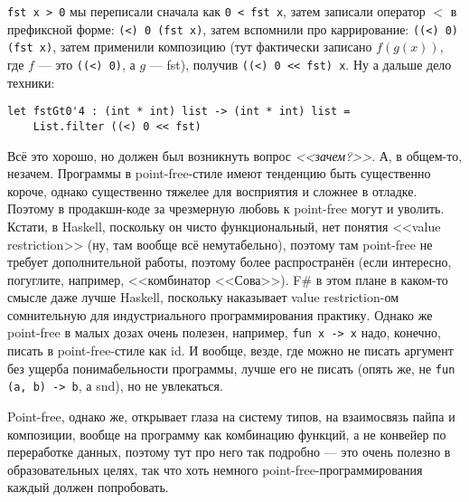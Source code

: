 \documentclass[a5paper]{article}
\begin{document}
\texttt{fst x > 0} мы переписали сначала как \texttt{0 < fst x}, затем записали оператор $<$ в префиксной форме: \texttt{(<) 0 (fst x)}, затем вспомнили про каррирование: \texttt{((<) 0) (fst x)}, затем применили композицию (тут фактически записано $f(g(x))$, где  $f$ --- это \texttt{((<) 0)}, а $g$ --- fst), получив \texttt{((<) 0 << fst) x}. Ну а дальше дело техники:

\begin{verbatim}
let fstGt0'4 : (int * int) list -> (int * int) list = 
    List.filter ((<) 0 << fst)
\end{verbatim}

Всё это хорошо, но должен был возникнуть вопрос \emph{<<зачем?>>}. А, в общем-то, незачем. Программы в point-free-стиле имеют тенденцию быть существенно короче, однако существенно тяжелее для восприятия и сложнее в отладке. Поэтому в продакшн-коде за чрезмерную любовь к point-free могут и уволить. Кстати, в Haskell, поскольку он чисто функциональный, нет понятия <<value restriction>> (ну, там вообще всё немутабельно), поэтому там point-free не требует дополнительной работы, поэтому более распространён (если интересно, погуглите, например, <<комбинатор <<Сова>>). F\# в этом плане в каком-то смысле даже лучше Haskell, поскольку наказывает value restriction-ом сомнительную для индустриального программирования практику. Однако же point-free в малых дозах очень полезен, например, \texttt{fun x -> x} надо, конечно, писать в point-free-стиле как id. И вообще, везде, где можно не писать аргумент без ущерба понимабельности программы, лучше его не писать (опять же, не \texttt{fun (a, b) -> b}, а snd), но не увлекаться.

Point-free, однако же, открывает глаза на систему типов, на взаимосвязь пайпа и композиции, вообще на программу как комбинацию функций, а не конвейер по переработке данных, поэтому тут про него так подробно --- это очень полезно в образовательных целях, так что хоть немного point-free-программирования каждый должен попробовать.
\end{document}
